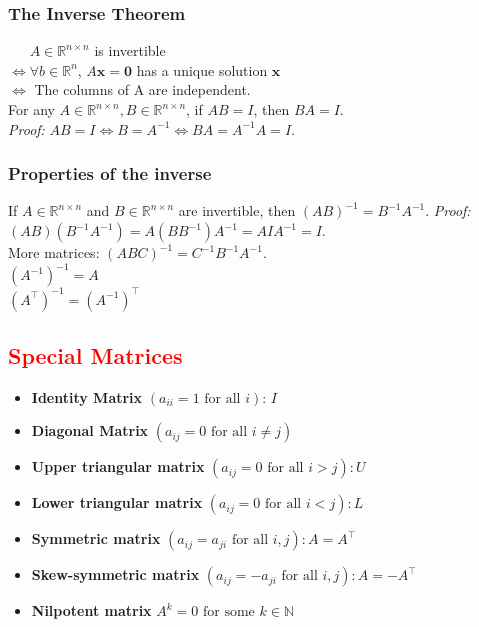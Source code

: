 \subsubsection{The Inverse Theorem}
$\phantom{\Leftrightarrow{ }}A \in \mathbb{R}^{n\times n}$ is invertible \\
$\Leftrightarrow \forall b \in \mathbb{R}^n$, $A\mathbf{x} = \mathbf{0}$ has a unique solution $\mathbf{x}$ \\
$\Leftrightarrow$ The columns of A are independent. \\[2.22mm]
For any $A \in \mathbb{R}^{n\times n}, B \in \mathbb{R}^{n\times n}$, if $AB = I$, then $BA = I$. \\
\textit{Proof:} $AB = I \Leftrightarrow B = A^{-1} \Leftrightarrow BA = A^{-1}A = I$.


\subsubsection{Properties of the inverse}
If $A \in \mathbb{R}^{n\times n}$ and $B \in \mathbb{R}^{n\times n}$ are invertible, then
$(AB)^{-1} = B^{-1}A^{-1}$.
\textit{Proof:} $(AB)(B^{-1}A^{-1}) = A(BB^{-1})A^{-1} = AIA^{-1} = I$. \\
More matrices: $(ABC)^{-1} = C^{-1}B^{-1}A^{-1}$. \\
$(A^{-1})^{-1}=A$ \\
$(A^\top)^{-1}=(A^{-1})^\top$

\subsection{\textcolor{red}{Special Matrices}}
\begin{itemize}
    \item \textbf{Identity Matrix} $(a_{ii}=1\text{ for all }i)$: $I$
    \item \textbf{Diagonal Matrix} $(a_{ij}=0\text{ for all }i\ne j)$
    \item \textbf{Upper triangular matrix} $(a_{ij}=0\text{ for all }i>j):U$
    \item \textbf{Lower triangular matrix} $(a_{ij}=0\text{ for all }i<j):L$
    \item \textbf{Symmetric matrix} $(a_{ij}=a_{ji}\text{ for all }i,j):A=A^\top$
    \item \textbf{Skew-symmetric matrix} $(a_{ij}=-a_{ji}\text{ for all }i,j):A=-A^\top$
    \item \textbf{Nilpotent matrix} $A^k = 0\text{ for some }k \in \mathbb{N}$
\end{itemize}

